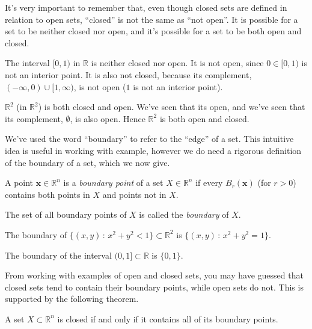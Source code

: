 \documentclass{ximera}
\begin{document}
It's very important to remember that, even though closed sets are defined in relation to open sets, {\color{red}``closed'' is not the same as ``not open''}. It is possible for a set to be neither closed nor open, and it's possible for a set to be both open and closed.

\begin{example}
\begin{foldable}
The interval $[0,1)$ in $\mathbb{R}$ is neither closed nor open. It is not open, since $0\in [0,1)$ is not an interior point. It is also not closed, because its complement, $(-\infty, 0)\cup [1,\infty)$, is not open ($1$ is not an interior point).

$\mathbb{R}^2$ (in $\mathbb{R}^2$) is both closed and open. We've seen that its open, and we've seen that its complement, $\emptyset$, is also open. Hence $\mathbb{R}^2$ is both open and closed.
\end{foldable}
\end{example} 

We've used the word ``boundary'' to refer to the ``edge'' of a set. This intuitive idea is useful in working with example, however we do need a rigorous definition of the boundary of a set, which we now give.

\begin{definition}
A point $\mathbf{x}\in\mathbb{R}^n$ is a \emph{boundary point} of a set $X\in \mathbb{R}^n$ if every $B_r(\mathbf{x})$ (for $r>0$) contains both points in $X$ and points not in $X$.

The set of all boundary points of $X$ is called the \emph{boundary} of $X$.
\end{definition}

\begin{example}
\begin{foldable}
The boundary of $\{(x,y)\,:\,x^2+y^2<1\}\subset\mathbb{R}^2$ is $\{(x,y)\,:\,x^2+y^2=1\}$. %

The boundary of the interval $(0,1]\subset\mathbb{R}$ is $\{0,1\}$.
\end{foldable}
\end{example}

From working with examples of open and closed sets, you may have guessed that closed sets tend to contain their boundary points, while open sets do not. This is supported by the following theorem.

\begin{theorem}
A set $X\subset\mathbb{R}^n$ is closed if and only if it contains all of its boundary points.
\end{theorem}
\end{document}
